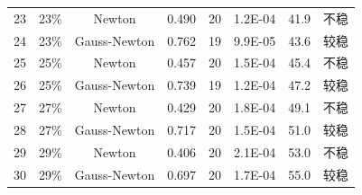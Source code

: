 {\begin{longtable}{cccccccc}
23&23\%&Newton&0.490&20&1.2E-04&41.9&不稳\\
24&23\%&Gauss-Newton&0.762&19&9.9E-05&43.6&较稳\\
25&25\%&Newton&0.457&20&1.5E-04&45.4&不稳\\
26&25\%&Gauss-Newton&0.739&19&1.2E-04&47.2&较稳\\
27&27\%&Newton&0.429&20&1.8E-04&49.1&不稳\\
28&27\%&Gauss-Newton&0.717&20&1.5E-04&51.0&较稳\\
29&29\%&Newton&0.406&20&2.1E-04&53.0&不稳\\
30&29\%&Gauss-Newton&0.697&20&1.7E-04&55.0&较稳\\
\end{longtable}
}
